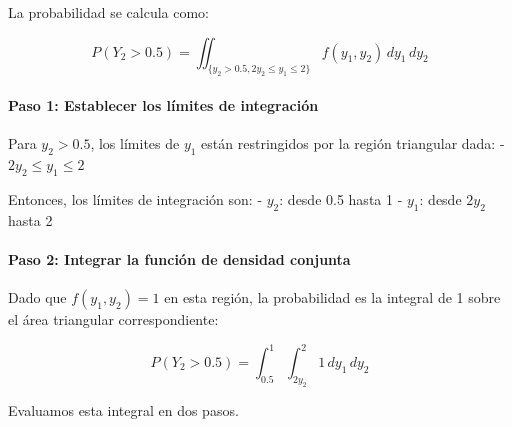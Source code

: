 \documentclass[
]{article}
\newenvironment{Shaded}{\begin{snugshade}}{\end{snugshade}}
\newcommand{\AttributeTok}[1]{\textcolor[rgb]{0.13,0.29,0.53}{#1}}
\newcommand{\ControlFlowTok}[1]{\textcolor[rgb]{0.13,0.29,0.53}{\textbf{#1}}}
\newcommand{\DecValTok}[1]{\textcolor[rgb]{0.00,0.00,0.81}{#1}}
\newcommand{\DocumentationTok}[1]{\textcolor[rgb]{0.56,0.35,0.01}{\textbf{\textit{#1}}}}
\newcommand{\FloatTok}[1]{\textcolor[rgb]{0.00,0.00,0.81}{#1}}
\newcommand{\FunctionTok}[1]{\textcolor[rgb]{0.13,0.29,0.53}{\textbf{#1}}}
\newcommand{\NormalTok}[1]{#1}
\newcommand{\OtherTok}[1]{\textcolor[rgb]{0.56,0.35,0.01}{#1}}
\newcommand{\SpecialCharTok}[1]{\textcolor[rgb]{0.81,0.36,0.00}{\textbf{#1}}}
\begin{document}
La probabilidad se calcula como:

\[
P(Y_2 > 0.5) = \iint_{\{y_2 > 0.5, 2 y_2 \leq y_1 \leq 2\}} f(y_1, y_2) \, dy_1 \, dy_2
\]

\paragraph{Paso 1: Establecer los límites de integración}\label{paso-1-establecer-los-luxedmites-de-integraciuxf3n}

Para \(y_2 > 0.5\), los límites de \(y_1\) están restringidos por la región triangular dada:
- \(2 y_2 \leq y_1 \leq 2\)

Entonces, los límites de integración son:
- \(y_2\): desde 0.5 hasta 1
- \(y_1\): desde \(2 y_2\) hasta 2

\paragraph{Paso 2: Integrar la función de densidad conjunta}\label{paso-2-integrar-la-funciuxf3n-de-densidad-conjunta}

Dado que \(f(y_1, y_2) = 1\) en esta región, la probabilidad es la integral de 1 sobre el área triangular correspondiente:

\[
P(Y_2 > 0.5) = \int_{0.5}^{1} \int_{2 y_2}^{2} 1 \, dy_1 \, dy_2
\]

Evaluamos esta integral en dos pasos.

\begin{Shaded}
\end{Shaded}
\end{document}
